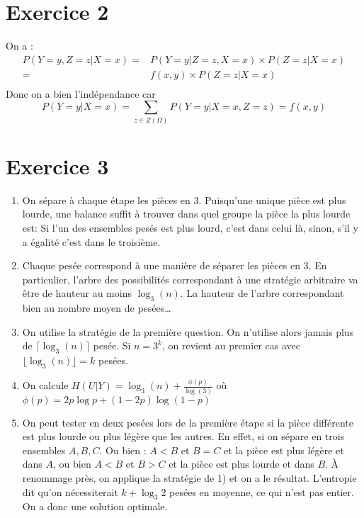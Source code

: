 \documentclass{cours}
\begin{document}
\section{Exercice 2}
On a : 
\[
	\begin{aligned}
		P(Y = y, Z = z | X = x) =& P(Y = y | Z = z, X = x)\times P(Z = z | X = x)\\
		=& f(x, y)\times P(Z = z | X = x)\\
	\end{aligned}
\]
Donc on a bien l'indépendance car 
\[
	P(Y = y | X = x) = \sum_{z \in Z(\Omega)} P(Y = y | X = x, Z = z) = f(x, y)
\]
\section{Exercice 3}
\begin{enumerate}
	\item On sépare à chaque étape les pièces en 3. Puisqu'une unique pièce est plus lourde, une balance suffit à trouver dans quel groupe la pièce la plus lourde est: Si l'un des ensembles pesés est plus lourd, c'est dans celui là, sinon, s'il y a égalité c'est dans le troisième. 
	\item Chaque pesée correspond à une manière de séparer les pièces en $3$. En particulier, l'arbre des possibilités correspondant à une stratégie arbitraire va être de hauteur au moins $\log_{3}(n)$. 
		La hauteur de l'arbre correspondant bien au nombre moyen de pesées\ldots
	\item On utilise la stratégie de la première question. On n'utilise alors jamais plus de $\lceil\log_{3}(n)\rceil$ pesée. Si $n = 3^{k}$, on revient au premier cas avec $\lfloor \log_{3}(n) \rfloor = k$ pesées.
	\item On calcule $H(U|Y) = \log_{3}(n) + \frac{\phi(p)}{\log(3)}$ où $\phi(p) = 2p\log p + (1 - 2p)\log(1 - p)$	
	\item On peut tester en deux pesées lors de la première étape si la pièce différente est plus lourde ou plus légère que les autres. En effet, si on sépare en trois ensembles $A, B, C$. Ou bien : $A < B$ et $B = C$ et la pièce est plus légère et dans $A$, ou bien $A < B$ et $B > C$ et la pièce est plus lourde et dans $B$. À renommage près, on applique la stratégie de 1) et on a le résultat. 
	L'entropie dit qu'on nécessiterait $k + \log_{3} 2$ pesées en moyenne, ce qui n'est pas entier. On a donc une solution optimale. 
\end{enumerate}
\end{document}
